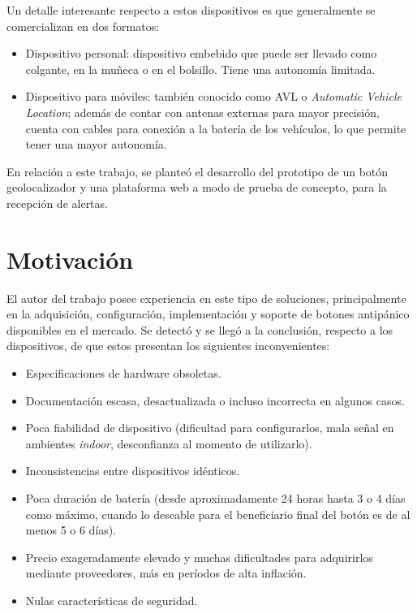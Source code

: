 Un detalle interesante respecto a estos dispositivos es que generalmente se comercializan en dos formatos:

\begin{itemize}
\item Dispositivo personal: dispositivo embebido que puede ser llevado como colgante, en la muñeca o en el bolsillo. Tiene una autonomía limitada.
\item Dispositivo para móviles: también conocido como AVL o \textit{Automatic Vehicle Location}; además de contar con antenas externas para mayor precisión, cuenta con cables para conexión a la batería de los vehículos, lo que permite tener una mayor autonomía.
\end{itemize}


En relación a este trabajo, se planteó el desarrollo del prototipo de un botón geolocalizador y una plataforma web a modo de prueba de concepto, para la recepción de alertas.


\section{Motivación}

El autor del trabajo posee experiencia en este tipo de soluciones, principalmente en la adquisición, configuración, implementación y soporte de botones antipánico disponibles en el mercado. Se detectó y se llegó a la conclusión, respecto a los dispositivos, de que estos presentan los siguientes inconvenientes:

\begin{itemize}
\item Especificaciones de hardware obsoletas.
\item Documentación escasa, desactualizada o incluso incorrecta en algunos casos.
\item Poca fiabilidad de dispositivo (dificultad para configurarlos, mala señal en ambientes \textit{indoor}, desconfianza al momento de utilizarlo).
\item Inconsistencias entre dispositivos idénticos.
\item Poca duración de batería (desde aproximadamente 24 horas hasta 3 o 4 días como máximo, cuando lo deseable para el beneficiario final del botón es de al menos 5 o 6 días).
\item Precio exageradamente elevado y muchas dificultades para adquirirlos mediante proveedores, más en períodos de alta inflación.
\item Nulas características de seguridad.
\end{itemize}

